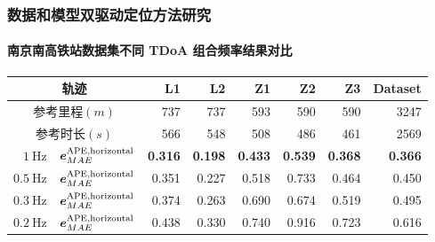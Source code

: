 \begin{frame}
 	\frametitle{数据和模型双驱动定位方法研究}
 	\framesubtitle{南京南高铁站数据集不同 TDoA 组合频率结果对比}
	{\small
		\setlength{\tabcolsep}{2pt}
		\begin{tabular*}{\linewidth}{@{\extracolsep{\fill}}rlrrrrrr}
			\toprule
		    \multicolumn{2}{c}{轨迹} & L1 & L2 & Z1 & Z2 & Z3 & Dataset \\
			\midrule
			\multicolumn{2}{c}{参考里程$\left(\unit{m}\right)$} & 737 & 737 & 593 & 590 & 590 & 3247 \\
			\midrule
			\multicolumn{2}{c}{参考时长$\left(\unit{s}\right)$} & 566 & 548 & 508 & 486 & 461 & 2569 \\
			\midrule
			\multirow{1}{*}{$\SI{1}{\hertz}$}
			& $\vb*{e}^{\mathrm{APE,horizontal}}_{MAE}$ & \textbf{0.316} & \textbf{0.198} & \textbf{0.433} & \textbf{0.539} & \textbf{0.368} & \textbf{0.366} \\
			\midrule
			\multirow{1}{*}{$\SI{0.5}{\hertz}$}
			& $\vb*{e}^{\mathrm{APE,horizontal}}_{MAE}$ & 0.351 & 0.227 & 0.518 & 0.733 & 0.464 & 0.450 \\
			\midrule
			\multirow{1}{*}{$\SI{0.3}{\hertz}$}
			& $\vb*{e}^{\mathrm{APE,horizontal}}_{MAE}$ & 0.374 & 0.263 & 0.690 & 0.674 & 0.519 & 0.495 \\
			\midrule
			\multirow{1}{*}{$\SI{0.2}{\hertz}$}
			& $\vb*{e}^{\mathrm{APE,horizontal}}_{MAE}$ & 0.438 & 0.330 & 0.740 & 0.916 & 0.723 & 0.616 \\		
			\bottomrule 
		\end{tabular*}
	}
\end{frame}

